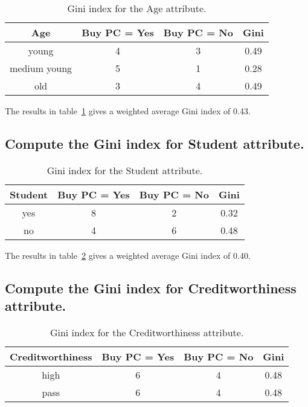 \documentclass[11pt,a4paper]{article}
\begin{document}
\begin{table}[h!]
  \begin{tabular}{|c|c|c||c|}
                                                        \hline
    Age          & Buy PC = Yes & Buy PC = No & Gini \\ \hline
    young        & 4            & 3           & 0.49 \\ \hline
    medium young & 5            & 1           & 0.28 \\ \hline
    old          & 3            & 4           & 0.49 \\ \hline
  \end{tabular}
  \caption{Gini index for the Age attribute.}
  \label{tab:age}
\end{table}

The results in table~\ref{tab:age} gives a weighted average Gini index of 0.43.

\subsection{Compute the Gini index for Student attribute.}

\begin{table}[h!]
  \begin{tabular}{|c|c|c||c|}
                                                   \hline
    Student & Buy PC = Yes & Buy PC = No & Gini \\ \hline
    yes     & 8            & 2           & 0.32 \\ \hline
    no      & 4            & 6           & 0.48 \\ \hline
  \end{tabular}
  \caption{Gini index for the Student attribute.}
  \label{tab:student}
\end{table}

The results in table~\ref{tab:student} gives a weighted average Gini index of 0.40.

\subsection{Compute the Gini index for Creditworthiness attribute.}

\begin{table}[h!]
  \begin{tabular}{|c|c|c||c|}
                                                            \hline
    Creditworthiness & Buy PC = Yes & Buy PC = No & Gini \\ \hline
    high             & 6            & 4           & 0.48 \\ \hline
    pass             & 6            & 4           & 0.48 \\ \hline
  \end{tabular}
  \caption{Gini index for the Creditworthiness attribute.}
  \label{tab:credit}
\end{table}
\end{document}
